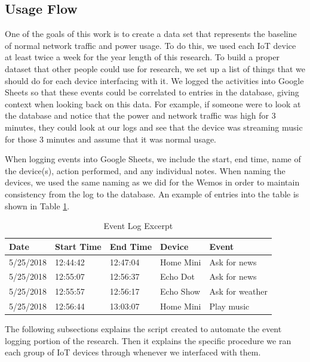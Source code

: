 \subsection{Usage Flow}

One of the goals of this work is to create a data set that represents the baseline of normal network traffic and power usage. To do this, we used each IoT device at least twice a week for the year length of this research. To build a proper dataset that other people could use for research, we set up a list of things that we should do for each device interfacing with it. We logged the activities into Google Sheets so that these events could be correlated to entries in the database, giving context when looking back on this data. For example, if someone were to look at the database and notice that the power and network traffic was high for 3 minutes, they could look at our logs and see that the device was streaming music for those 3 minutes and assume that it was normal usage.

When logging events into Google Sheets, we include the start, end time, name of the device(s), action performed, and any individual notes. When naming the devices, we used the same naming as we did for the Wemos in order to maintain consistency from the log to the database. An example of entries into the table is shown in Table \ref{tab:events}.

\begin{table}[H]
    \centering
    \caption{Event Log Excerpt}
    \begin{tabular}{@{}lllll@{}}
        \toprule
        Date & Start Time & End Time & Device & Event \\ \midrule
        5/25/2018 & 12:44:42 & 12:47:04 & Home Mini & Ask for news \\
        5/25/2018 & 12:55:07 & 12:56:37 & Echo Dot & Ask for news \\
        5/25/2018 & 12:55:57 & 12:56:17 & Echo Show & Ask for weather \\
        5/25/2018 & 12:56:44 & 13:03:07 & Home Mini & Play music \\ \bottomrule
        \end{tabular}
    \label{tab:events}
\end{table}

The following subsections explains the script created to automate the event logging portion of the research. Then it explains the specific procedure we ran each group of IoT devices through whenever we interfaced with them.

